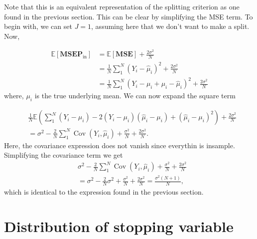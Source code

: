 \documentclass{article}
\theoremstyle{definition}
\theoremstyle{remark}
\newcommand{\E }{\mathbb{E}}  %
\newcommand{\Cov}{\operatorname{Cov}}  %
\newcommand{\MSEPin}{\textbf{MSEP}_{\text{in}}}
\newcommand{\MSE}{\textbf{MSE}}
\begin{document}
Note that this is an equivalent representation of the splitting criterion as one
found in the previous section. This can be clear by simplifying the MSE term.
To begin with, we can set $ J = 1 $, assuming here that we don't want to make a
split. Now,

\begin{align*}
	\E[\MSEPin] & = \E[\MSE] +  \frac{2 \sigma^2 }{N}                                                     \\
	            & = \frac{1}{N}\sum_{1}^{N} (Y_i - \widehat \mu_i)^2  +  \frac{2 \sigma^2
	}{N}                                                                                                  \\
	            & = \frac{1}{N}\sum_{1}^{N} (Y_i - \mu_i + \mu_i - \widehat \mu_i)^2  +  \frac{2 \sigma^2
	}{N}
\end{align*}
where, $ \mu_i $ is the true underlying mean. We can now expand the square term

\begin{align*}
	 & \frac{1}{N} \E \left(   \sum_{1}^{N} (Y_i - \mu_i) -2(Y_i - \mu_i)(\widehat \mu_i - \mu_i)
	+ (\widehat \mu_i - \mu_i)^2\right)  +  \frac{2 \sigma^2
	}{N}                                                                                          \\
	 & = \sigma^2 - \frac{2}{N} \sum_{1}^{N}\Cov \left(Y_i, \widehat \mu_i
	\right) + \frac{\sigma^2}{N} + \frac{2 \sigma^2
	}{N}.
\end{align*}
Here, the covariance expression does not vanish since everythin is insample. Simplifying the covariance term we get
\begin{align*}
	 & \sigma^2 - \frac{2}{N} \sum_{1}^{N}\Cov \left(Y_i, \widehat \mu_i
	\right) + \frac{\sigma^2}{N} + \frac{2\sigma^2}{N}                          \\
	 & = \sigma^2 -\frac{2}{N} \sigma^2 + \frac{\sigma^2}{N} + \frac{2 \sigma^2
	}{N} = \frac{\sigma^2(N + 1)}{N},
\end{align*}
which is identical to the expression found in the previous section.


\section{Distribution of stopping variable}
\end{document}
